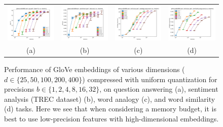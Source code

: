 \begin{figure}
	\centering
	\begin{tabular}{@{\hskip -0.0in}c@{\hskip -0.0in}c@{\hskip -0.0in}c@{\hskip -0.0in}c@{\hskip -0.0in}}
		\includegraphics[width=.245\linewidth]{figures/glove-wiki400k-am_qa_best-f1_vs_compression.pdf} &
		\includegraphics[width=.245\linewidth]{figures/glove-wiki400k-am_sentiment_trec_test-acc_vs_compression.pdf} &
		\includegraphics[width=.245\linewidth]{figures/glove-wiki400k-am_intrinsics_analogy-avg-score_vs_compression.pdf} &
		\includegraphics[width=.245\linewidth]{figures/glove-wiki400k-am_intrinsics_similarity-avg-score_vs_compression.pdf} \\
		\;\;\;\;\;(a) & \;\;\;\;\;\;(b) & \;\;\;\;\;\;(c) & \;\;\;\;\;\;(d)
	\end{tabular}			
\caption{
Performance of GloVe embeddings of various dimensions ($d\in\{25,50,100,200,400\}$) compressed with uniform quantization for precisions $b \in \{1,2,4,8,16,32\}$, on question answering (a), sentiment analysis (TREC dataset) (b), word analogy (c), and word similarity (d) tasks.
Here we see that when considering a memory budget, it is best to use low-precision features with high-dimensional embeddings.}
\label{fig:dimVsPrec}
\end{figure}

